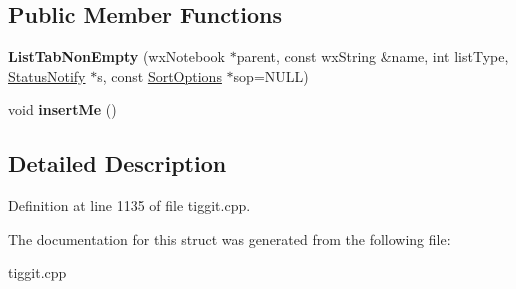 \subsection*{Public Member Functions}
\begin{DoxyCompactItemize}
\item 
\hypertarget{struct_list_tab_non_empty_a2d51affea22726ec818f2f7568be15cf}{{\bfseries List\-Tab\-Non\-Empty} (wx\-Notebook $\ast$parent, const wx\-String \&name, int list\-Type, \hyperlink{struct_status_notify}{Status\-Notify} $\ast$s, const \hyperlink{struct_sort_options}{Sort\-Options} $\ast$sop=N\-U\-L\-L)}\label{struct_list_tab_non_empty_a2d51affea22726ec818f2f7568be15cf}

\item 
\hypertarget{struct_list_tab_non_empty_a7bd81757123eda9b7c317c321bf32e30}{void {\bfseries insert\-Me} ()}\label{struct_list_tab_non_empty_a7bd81757123eda9b7c317c321bf32e30}

\end{DoxyCompactItemize}


\subsection{Detailed Description}


Definition at line 1135 of file tiggit.\-cpp.



The documentation for this struct was generated from the following file\-:\begin{DoxyCompactItemize}
\item 
tiggit.\-cpp\end{DoxyCompactItemize}
